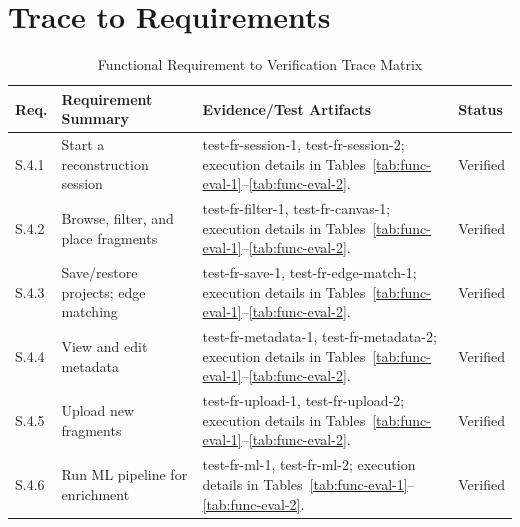 \documentclass[12pt, titlepage]{article}
\begin{document}
\section{Trace to Requirements}

\begin{table}[H]
\centering
\footnotesize
\setlength{\tabcolsep}{3pt}
\caption{Functional Requirement to Verification Trace Matrix}
\begin{tabularx}{\textwidth}{p{1.2cm}X X p{0.9cm}}
\toprule
\textbf{Req.} & \textbf{Requirement Summary} & \textbf{Evidence/Test Artifacts} & \textbf{Status}\\
\midrule
S.4.1 & Start a reconstruction session & test-fr-session-1, test-fr-session-2; execution details in Tables~\ref{tab:func-eval-1}--\ref{tab:func-eval-2}. & Verified\\
S.4.2 & Browse, filter, and place fragments & test-fr-filter-1, test-fr-canvas-1; execution details in Tables~\ref{tab:func-eval-1}--\ref{tab:func-eval-2}. & Verified\\
S.4.3 & Save/restore projects; edge matching & test-fr-save-1, test-fr-edge-match-1; execution details in Tables~\ref{tab:func-eval-1}--\ref{tab:func-eval-2}. & Verified\\
S.4.4 & View and edit metadata & test-fr-metadata-1, test-fr-metadata-2; execution details in Tables~\ref{tab:func-eval-1}--\ref{tab:func-eval-2}. & Verified\\
S.4.5 & Upload new fragments & test-fr-upload-1, test-fr-upload-2; execution details in Tables~\ref{tab:func-eval-1}--\ref{tab:func-eval-2}. & Verified\\
S.4.6 & Run ML pipeline for enrichment & test-fr-ml-1, test-fr-ml-2; execution details in Tables~\ref{tab:func-eval-1}--\ref{tab:func-eval-2}. & Verified\\
\bottomrule
\end{tabularx}
\setlength{\tabcolsep}{6pt}
\end{table}
\end{document}
